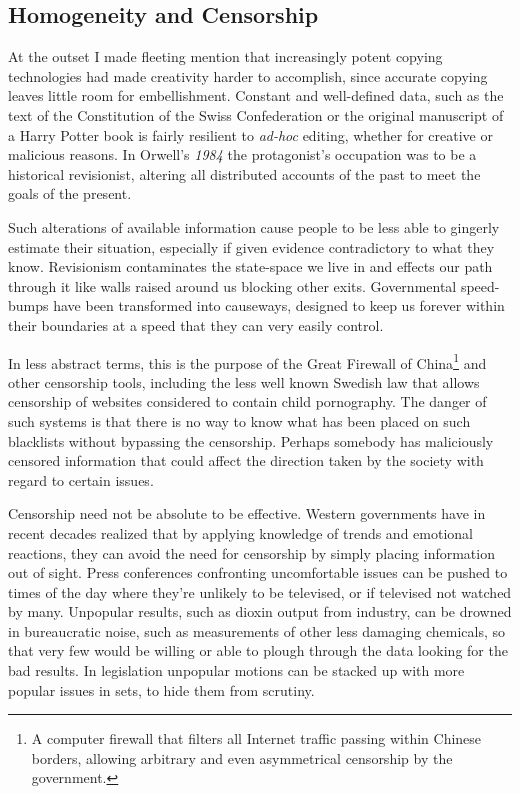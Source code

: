 \subsection{Homogeneity and Censorship}
\label{s:artificial_scarcity:burning_bridges:homogeneity}

At the outset I made f\hbox{}leeting mention that increasingly potent copying
technologies had made creativity harder to accomplish, since accurate copying
leaves little room for embellishment. Constant and well-def\hbox{}ined data,
such as the text of the Constitution of the Swiss Confederation or the original
manuscript of a Harry Potter book is fairly resilient to \textit{ad-hoc}
editing, whether for creative or malicious reasons. In Orwell's \textit{1984}
the protagonist's occupation was to be a historical revisionist, altering all
distributed accounts of the past to meet the goals of the present.

Such alterations of available information cause people to be less able to
gingerly estimate their situation, especially if given evidence contradictory 
to what they know. Revisionism contaminates the state-space we live in and
ef\hbox{}fects our path through it like walls raised around us blocking other
exits. Governmental speed-bumps have been transformed into causeways, designed
to keep us forever within their boundaries at a speed that they can very easily
control.

In less abstract terms, this is the purpose of the Great F\hbox{}irewall of
China\footnote{A computer f\hbox{}irewall that f\hbox{}ilters all Internet
traf\hbox{}f\hbox{}ic passing within Chinese borders, allowing arbitrary and
even asymmetrical censorship by the government.} and other censorship tools,
including the less well known Swedish law that allows censorship of websites
considered to contain child pornography. The danger of such systems is that
there is no way to know what has been placed on such blacklists without
bypassing the censorship. Perhaps somebody has maliciously censored information
that could af\hbox{}fect the direction taken by the society with regard to
certain issues.

Censorship need not be absolute to be ef\hbox{}fective. Western governments 
have in recent decades realized that by applying knowledge of trends and
emotional reactions, they can avoid the need for censorship by simply placing
information out of sight. Press conferences confronting uncomfortable issues 
can be pushed to times of the day where they're unlikely to be televised, or if
televised not watched by many. Unpopular results, such as dioxin output from
industry, can be drowned in bureaucratic noise, such as measurements of other
less damaging chemicals, so that very few would be willing or able to plough
through the data looking for the bad results. In legislation unpopular motions
can be stacked up with more popular issues in sets, to hide them from scrutiny.

